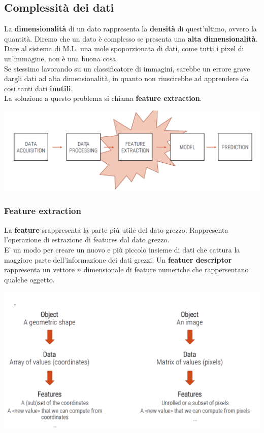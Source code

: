 \subsection{Complessità dei dati}
{
    La \textbf{dimensionalità} di un dato rappresenta la 
%
    \textbf{densità} di quest'ultimo, ovvero la quantità.
}
{
    Diremo che un dato è complesso se presenta una 
%
    \textbf{alta dimensionalità}. 
}
Dare al sistema di M.L. una mole spoporzionata di dati, come tutti
%
i pixel di un'immagine, non è una buona cosa.
\\
Se stessimo lavorando su un classificatore di immagini, sarebbe un
%
errore grave dargli dati ad alta dimensionalità, in quanto non 
%
riuscirebbe ad apprendere da così tanti dati \textbf{inutili}.
\\ 
La soluzione a questo problema si chiama \textbf{feature extraction}.
\begin{center}
    \includegraphics[scale=0.5]{images/Feature_extraction.png}
\end{center}
\subsubsection{Feature extraction}
{
    La \textbf{feature} srappresenta la parte più utile del dato 
%
    grezzo.
}
{
    Rappresenta l'operazione di estrazione di features dal dato grezzo.
\\ 
    E' un modo per creare un nuovo e più piccolo insieme di dati 
%
    che cattura la maggiore parte dell'informazione dei dati grezzi.
}
{
    Un \textbf{featuer descriptor} rappresenta un vettore \(n\)
%
    dimensionale di feature numeriche che rappersentano qualche
%
    oggetto.
}
\begin{center}
    \includegraphics[scale=2]{images/Feature_example.png}
\end{center}
\newpage
